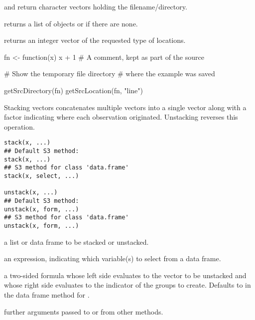 %
\begin{Value}
 and  return character vectors 
holding the filename/directory.

 returns a list of  objects or
 if there are none.

 returns an integer vector of the requested type
of locations.
\end{Value}
%
\begin{SeeAlso}\relax
{}
\end{SeeAlso}
%
\begin{Examples}
\begin{ExampleCode}
fn <- function(x) {
  x + 1 # A comment, kept as part of the source
}			    

# Show the temporary file directory
# where the example was saved

getSrcDirectory(fn)  
getSrcLocation(fn, "line")
\end{ExampleCode}
\end{Examples}
%
\begin{Description}\relax
Stacking vectors concatenates multiple vectors into a single vector
along with a factor indicating where each observation originated.
Unstacking reverses this operation.
\end{Description}
%
\begin{Usage}
\begin{verbatim}
stack(x, ...)
## Default S3 method:
stack(x, ...)
## S3 method for class 'data.frame'
stack(x, select, ...)

unstack(x, ...)
## Default S3 method:
unstack(x, form, ...)
## S3 method for class 'data.frame'
unstack(x, form, ...)
\end{verbatim}
\end{Usage}
%
\begin{Arguments}
\begin{ldescription}
\item[\code{x}] a list or data frame to be stacked or unstacked.
\item[\code{select}] an expression, indicating which variable(s) to select from a
data frame.
\item[\code{form}] a two-sided formula whose left side evaluates to the
vector to be unstacked and whose right side evaluates to the
indicator of the groups to create.  Defaults to 
in the data frame method for .
\item[\code{...}] further arguments passed to or from other methods.
\end{ldescription}
\end{Arguments}
